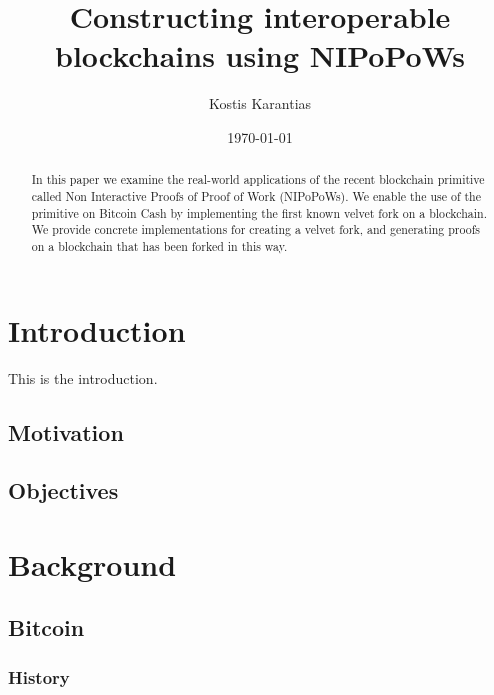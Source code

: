 \documentclass[11pt]{llncs}
\begin{document}
\title{Constructing interoperable blockchains using NIPoPoWs}
\date{\today}
\author{Kostis Karantias\\
    }
\maketitle
\noindent
\makebox[\linewidth]{\small \today}

\newpage

\begin{abstract}
  In this paper we examine the real-world applications of the recent blockchain
  primitive called Non Interactive Proofs of Proof of Work (NIPoPoWs). We
  enable the use of the primitive on Bitcoin Cash by implementing the first
  known velvet fork on a blockchain. We provide concrete implementations for
  creating a velvet fork, and generating proofs on a blockchain that has been
  forked in this way.
\end{abstract}

\newpage

\tableofcontents

\newpage

\thispagestyle{plain}

\section{Introduction}

This is the introduction.

\subsection{Motivation}
\subsection{Objectives}

\section{Background}

\subsection{Bitcoin}

\subsubsection{History}
\end{document}

